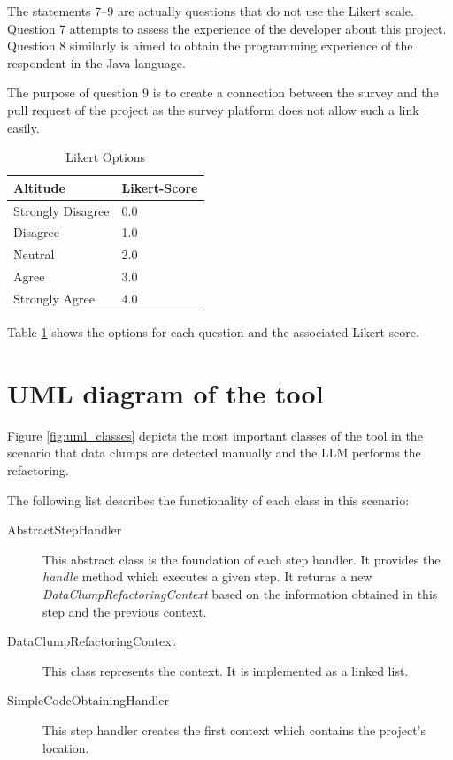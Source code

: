 \begin{appendices}
\begin{enumerate}
\end{enumerate}


The statements 7--9 are actually questions that do not use the Likert scale. Question 7 attempts to assess the experience of the developer about this project. Question 8 similarly is aimed to obtain the programming experience of the respondent in the Java language.

The purpose of question 9 is to create a connection between the survey and the pull request of the project as the survey platform does not allow such a link easily.

\begin{table}[ht!]
    \centering
    \begin{tabular}{m{5cm}|m{1cm}}
         Altitude & Likert-Score  \\\hline
        Strongly Disagree & 0.0\\\hline
        Disagree & 1.0 \\\hline
        Neutral & 2.0 \\\hline
        Agree & 3.0 \\\hline
    Strongly Agree & 4.0\\\hline
        
        
    \end{tabular}
    \caption{Likert Options}
    \label{tab:likert_options}
\end{table}

Table \ref{tab:likert_options} shows the options for each question and the associated Likert score.





\chapter{UML diagram of the tool} \label{app:uml_diagram}
Figure \ref{fig:uml_classes} depicts the most important classes of the tool in the scenario that data clumps are detected manually and the \ac{LLM} performs the refactoring. 

The following list describes the functionality of each class in this scenario:
\begin{description}
    \item [AbstractStepHandler] This abstract class is the foundation of each step handler. It provides the \textit{handle} method which executes a given step. It returns a new \textit{DataClumpRefactoringContext} based on the information obtained in this step and the previous context.
    \item [DataClumpRefactoringContext] This class represents the context. It is implemented as a linked list. 
    \item[SimpleCodeObtainingHandler] This step handler creates the first context which contains the project's location.


\end{description}
\end{appendices}
